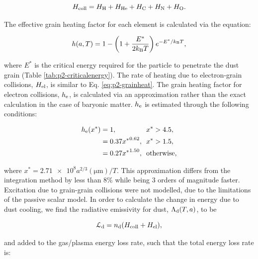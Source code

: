 \begin{equation}
  H_\text{coll} = H_\text{H} + H _\text{He} + H_\text{C} + H_\text{N} + H_\text{O} .
\end{equation}

\noindent
The effective grain heating factor for each element is calculated via the equation:

\begin{equation}
  h(a,T) = 1 - \left( 1 + \frac{E^*}{2 k_\text{B} T} \right) e^{- E^* / k_\text{B} T} ,
\end{equation}

\noindent
where $E^*$ is the critical energy required for the particle to penetrate the dust grain (Table \ref{tab:p2-criticalenergy}).
The rate of heating due to electron-grain collisions, $H_\text{el}$, is similar to Eq. \ref{eq:p2-grainheat}.
The grain heating factor for electron collisions, $h_\text{e}$, is calculated via an approximation rather than the exact calculation in the case of baryonic matter.
$h_\text{e}$ is estimated through the following conditions:

\begin{equation}
  \begin{alignedat}{3}
    h_\text{e}(x^*) & = 1 ,                && ~~ x^* > 4.5, \\
             & = 0.37{x^*}^{0.62} , && ~~ x^* > 1.5 , \\
             & = 0.27{x^*}^{1.50} , && ~~ \text{otherwise,}
  \end{alignedat}
\end{equation}

\noindent
where $x^* = \num{2.71e8} a^{2/3} (\si{\micro\metre})/T$.
This approximation differs from the integration method by less than 8\% while being 3 orders of magnitude faster.
Excitation due to grain-grain collisions were not modelled, due to the limitations of the passive scalar model.
In order to calculate the change in energy due to dust cooling, we find the radiative emissivity for dust, $\Lambda_\text{d}(T,a)$, to be

\begin{equation}
  \mathcal{L}_\text{d} = n_\text{d} (H_\text{coll} + H_\text{el}) ,
\end{equation}

\noindent
and added to the gas/plasma energy loss rate, such that the total energy loss rate is:

